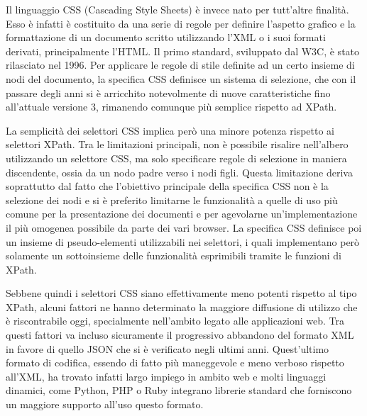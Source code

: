 \documentclass[12pt]{toptesi}
\begin{document}
Il linguaggio CSS (Cascading Style Sheets) è invece nato per tutt'altre finalità. Esso è infatti è costituito da una serie di regole per definire l'aspetto grafico e la formattazione di un documento scritto utilizzando l'XML o i suoi formati derivati, principalmente l'HTML. Il primo standard, sviluppato dal W3C, è stato rilasciato nel 1996. Per applicare le regole di stile definite ad un certo insieme di nodi del documento, la specifica CSS definisce un sistema di selezione, che con il passare degli anni si è arricchito notevolmente di nuove caratteristiche fino all'attuale versione 3, rimanendo comunque più semplice rispetto ad XPath. 

La semplicità dei selettori CSS implica però una minore potenza rispetto ai selettori XPath. Tra le limitazioni principali, non è possibile risalire nell'albero utilizzando un selettore CSS, ma solo specificare regole di selezione in maniera discendente, ossia da un nodo padre verso i nodi figli. Questa limitazione deriva soprattutto dal fatto che l'obiettivo principale della specifica CSS non è la selezione dei nodi e si è preferito limitarne le funzionalità a quelle di uso più comune per la presentazione dei documenti e per agevolarne un'implementazione il più omogenea possibile da parte dei vari browser. La specifica CSS definisce poi un insieme di pseudo-elementi utilizzabili nei selettori, i quali implementano però solamente un sottoinsieme delle funzionalità esprimibili tramite le funzioni di XPath.

Sebbene quindi i selettori CSS siano effettivamente meno potenti rispetto al tipo XPath, alcuni fattori ne hanno determinato la maggiore diffusione di utilizzo che è riscontrabile oggi, specialmente nell'ambito legato alle applicazioni web.
Tra questi fattori va incluso sicuramente il progressivo abbandono del formato XML in favore di quello JSON che si è verificato negli ultimi anni. Quest'ultimo formato di codifica, essendo di fatto più maneggevole e meno verboso rispetto all'XML, ha trovato infatti largo impiego in ambito web e molti linguaggi dinamici, come Python, PHP o Ruby integrano librerie standard che forniscono un maggiore supporto all'uso questo formato. 
\end{document}
